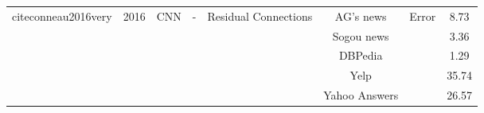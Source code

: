\documentclass[12pt, a4paper, oneside]{report}
\begin{document}
\begin{tabular}{|c|c|c|c|c|c|cc|}
    \multirow{6}{*}{cite{conneau2016very}}              & \multirow{6}{*}{2016} & \multirow{6}{*}{CNN}              & \multirow{6}{*}{-}                      & \multirow{6}{*}{Residual Connections}                                                                  & AG’s news                             & \multicolumn{1}{c|}{\multirow{6}{*}{Error}}                                                                                        & 8.73   \\ \cline{6-6} \cline{8-8} 
                                                                          &                       &                                   &                                         &                                                                                                        & Sogou news                            & \multicolumn{1}{c|}{}                                                                                                              & 3.36   \\ \cline{6-6} \cline{8-8} 
                                                                          &                       &                                   &                                         &                                                                                                        & DBPedia                               & \multicolumn{1}{c|}{}                                                                                                              & 1.29   \\ \cline{6-6} \cline{8-8} 
                                                                          &                       &                                   &                                         &                                                                                                        & Yelp                                  & \multicolumn{1}{c|}{}                                                                                                              & 35.74  \\ \cline{6-6} \cline{8-8} 
                                                                          &                       &                                   &                                         &                                                                                                        & Yahoo Answers                         & \multicolumn{1}{c|}{}                                                                                                              & 26.57  \\ \cline{6-6} \cline{8-8} 

\end{tabular}
\end{document}
